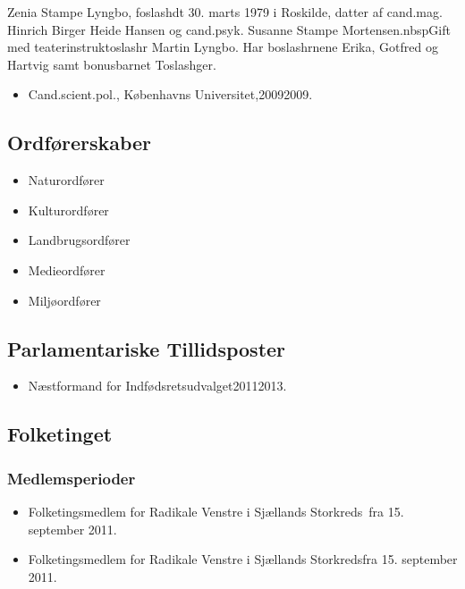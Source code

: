 \documentclass[11pt, a4paper]{awesome-cv}
\begin{document}
\makecvheader[R]
\makelettertitle
\begin{cvletter}
Zenia Stampe Lyngbo, foslashdt 30. marts 1979 i Roskilde, datter af cand.mag. Hinrich Birger Heide Hansen og cand.psyk. Susanne Stampe Mortensen.nbspGift med teaterinstruktoslashr Martin Lyngbo. Har boslashrnene Erika, Gotfred og Hartvig samt bonusbarnet Toslashger.

\begin{itemize}
\item Cand.scient.pol., Københavns Universitet,20092009.
\end{itemize}
\subsection*{Ordførerskaber}
\begin{itemize}
\item Naturordfører
\item Kulturordfører
\item Landbrugsordfører
\item Medieordfører
\item Miljøordfører
\end{itemize}
\subsection*{Parlamentariske Tillidsposter}
\begin{itemize}
\item Næstformand for Indfødsretsudvalget20112013.
\end{itemize}
\subsection*{Folketinget}
\subsubsection*{Medlemsperioder}
\begin{itemize}
\item Folketingsmedlem for Radikale Venstre i Sjællands Storkreds fra 15. september 2011.
\item Folketingsmedlem for Radikale Venstre i Sjællands Storkredsfra 15. september 2011.
\end{itemize}

\end{cvletter}
\end{document}
